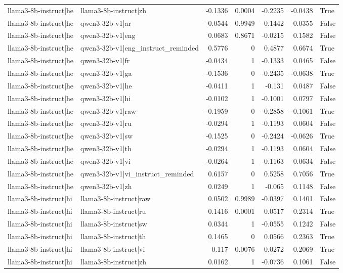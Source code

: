 \begin{table}
\begin{tabular}{l l r r r r l}
llama3-8b-instruct|he & llama3-8b-instruct|zh & -0.1336 & 0.0004 & -0.2235 & -0.0438 & True \\
llama3-8b-instruct|he & qwen3-32b-v1|ar & -0.0544 & 0.9949 & -0.1442 & 0.0355 & False \\
llama3-8b-instruct|he & qwen3-32b-v1|eng & 0.0683 & 0.8671 & -0.0215 & 0.1582 & False \\
llama3-8b-instruct|he & qwen3-32b-v1|eng_instruct_reminded & 0.5776 & 0 & 0.4877 & 0.6674 & True \\
llama3-8b-instruct|he & qwen3-32b-v1|fr & -0.0434 & 1 & -0.1333 & 0.0465 & False \\
llama3-8b-instruct|he & qwen3-32b-v1|ga & -0.1536 & 0 & -0.2435 & -0.0638 & True \\
llama3-8b-instruct|he & qwen3-32b-v1|he & -0.0411 & 1 & -0.131 & 0.0487 & False \\
llama3-8b-instruct|he & qwen3-32b-v1|hi & -0.0102 & 1 & -0.1001 & 0.0797 & False \\
llama3-8b-instruct|he & qwen3-32b-v1|raw & -0.1959 & 0 & -0.2858 & -0.1061 & True \\
llama3-8b-instruct|he & qwen3-32b-v1|ru & -0.0294 & 1 & -0.1193 & 0.0604 & False \\
llama3-8b-instruct|he & qwen3-32b-v1|sw & -0.1525 & 0 & -0.2424 & -0.0626 & True \\
llama3-8b-instruct|he & qwen3-32b-v1|th & -0.0294 & 1 & -0.1193 & 0.0604 & False \\
llama3-8b-instruct|he & qwen3-32b-v1|vi & -0.0264 & 1 & -0.1163 & 0.0634 & False \\
llama3-8b-instruct|he & qwen3-32b-v1|vi_instruct_reminded & 0.6157 & 0 & 0.5258 & 0.7056 & True \\
llama3-8b-instruct|he & qwen3-32b-v1|zh & 0.0249 & 1 & -0.065 & 0.1148 & False \\
llama3-8b-instruct|hi & llama3-8b-instruct|raw & 0.0502 & 0.9989 & -0.0397 & 0.1401 & False \\
llama3-8b-instruct|hi & llama3-8b-instruct|ru & 0.1416 & 0.0001 & 0.0517 & 0.2314 & True \\
llama3-8b-instruct|hi & llama3-8b-instruct|sw & 0.0344 & 1 & -0.0555 & 0.1242 & False \\
llama3-8b-instruct|hi & llama3-8b-instruct|th & 0.1465 & 0 & 0.0566 & 0.2363 & True \\
llama3-8b-instruct|hi & llama3-8b-instruct|vi & 0.117 & 0.0076 & 0.0272 & 0.2069 & True \\
llama3-8b-instruct|hi & llama3-8b-instruct|zh & 0.0162 & 1 & -0.0736 & 0.1061 & False \\

\end{tabular}
\end{table}
